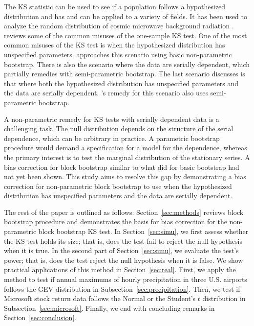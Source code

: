 \documentclass[12pt, titlepage, letterpaper]{article}
\begin{document}
{The KS statistic 
can be used to see if a population follows a hypothesized distribution and has 
and can be applied to a variety of fields. It has
been used to analyze the random distribution of cosmic microwave background 
radiation \citep{naess2012application}. \citet{zeimbekakis2022misuses} reviews
some of the common misuses of the one-sample KS test. One of the most common 
misuses of the KS test is when
the hypothesized distribution has unspecified parameters. 
\citet{babu2004goodness} approaches this scenario using basic 
non-parametric bootstrap. There is also the scenario where the data are serially
dependent, which \citet{zeimbekakis2022misuses} partially remedies with 
semi-parametric
bootstrap. The last scenario \citet{zeimbekakis2022misuses} discusses is that
where both the hypothesized 
distribution has unspecified parameters and the data are 
serially dependent. \citet{zeimbekakis2022misuses}'s remedy for
this scenario also uses semi-parametric bootstrap.


A non-parametric remedy for KS tests with serially dependent data is
a challenging task. The null distribution depends on the structure of the serial
dependence, which can be arbitrary in practice. A parametric bootstrap procedure
would demand a specification for a model for the dependence, whereas the primary 
interest
is to test the marginal distribution of the stationary series. A bias 
correction
for block bootstrap similar to what \citet{babu2004goodness} did for basic
bootstrap had not yet been shown.  This study aims to resolve this gap by 
demonstrating a bias 
correction
for non-parametric block bootstrap to use when the hypothesized distribution
has unspecified parameters and the data are serially dependent.


The rest of the paper is outlined as follows: Section~\ref{sec:methods} reviews
block bootstrap procedure and demonstrates the basis for bias correction for
the non-parametric block bootstrap KS test. In Section~\ref{sec:simu}, we first 
assess whether the KS
test holds its size; that is, does the test fail to reject the null hypothesis
when it is true. In the second part of Section~\ref{sec:simu}, we 
evaluate the 
test's power; that is, does the test reject the null hypothesis when it is 
false. We show practical applications of this method in Section~\ref{sec:real}.
First, we apply the method to test if annual maximums of hourly precipitation
in three U.S. airports follows the GEV distribution in 
Subsection~\ref{sec:precipitation}.
Then, we test if Microsoft stock return data follows the Normal or the Student's
$t$ distribution in Subsection~\ref{sec:microsoft}.
Finally, we end with 
concluding remarks in Section~\ref{sec:conclusion}.


}
\end{document}
